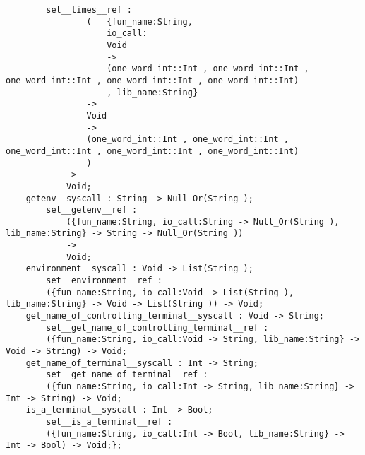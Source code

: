 \begin{verbatim}
        set__times__ref :
                (   {fun_name:String,
                    io_call:
                    Void
                    ->
                    (one_word_int::Int , one_word_int::Int , one_word_int::Int , one_word_int::Int , one_word_int::Int)
                    , lib_name:String}
                ->
                Void
                ->
                (one_word_int::Int , one_word_int::Int , one_word_int::Int , one_word_int::Int , one_word_int::Int)
                )
            ->
            Void;
    getenv__syscall : String -> Null_Or(String );
        set__getenv__ref :
            ({fun_name:String, io_call:String -> Null_Or(String ), lib_name:String} -> String -> Null_Or(String ))
            ->
            Void;
    environment__syscall : Void -> List(String );
        set__environment__ref :
        ({fun_name:String, io_call:Void -> List(String ), lib_name:String} -> Void -> List(String )) -> Void;
    get_name_of_controlling_terminal__syscall : Void -> String;
        set__get_name_of_controlling_terminal__ref :
        ({fun_name:String, io_call:Void -> String, lib_name:String} -> Void -> String) -> Void;
    get_name_of_terminal__syscall : Int -> String;
        set__get_name_of_terminal__ref :
        ({fun_name:String, io_call:Int -> String, lib_name:String} -> Int -> String) -> Void;
    is_a_terminal__syscall : Int -> Bool;
        set__is_a_terminal__ref :
        ({fun_name:String, io_call:Int -> Bool, lib_name:String} -> Int -> Bool) -> Void;};
\end{verbatim}
